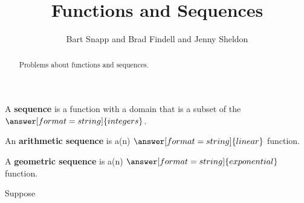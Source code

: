 \documentclass[nooutcomes]{ximera}
\title{Functions and Sequences}
\author{Bart Snapp and Brad Findell and Jenny Sheldon}
\begin{document}
\begin{abstract}
Problems about functions and sequences.
\end{abstract}
\maketitle



%
%

\begin{problem}
A \textbf{sequence} is a function with a domain that is a subset of the $\answer[format=string]{integers}$.  

An \textbf{arithmetic sequence} is a(n) $\answer[format=string]{linear}$ function. 

A \textbf{geometric sequence} is a(n) $\answer[format=string]{exponential}$ function. 
\end{problem}

\begin{problem}
Suppose 

\end{problem}
\end{document}
